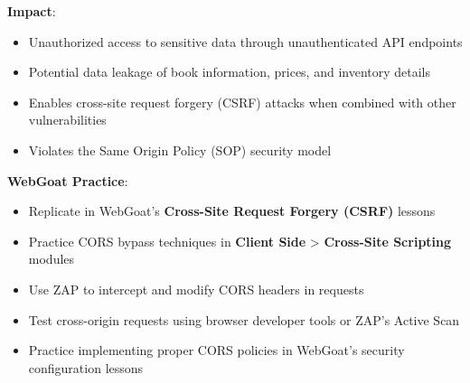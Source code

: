 \documentclass[]{UCD_CS_FYP_Report}
\begin{document}


\textbf{Impact}:
\begin{itemize}
    \item Unauthorized access to sensitive data through unauthenticated API endpoints
    \item Potential data leakage of book information, prices, and inventory details
    \item Enables cross-site request forgery (CSRF) attacks when combined with other vulnerabilities
    \item Violates the Same Origin Policy (SOP) security model
\end{itemize}

\textbf{WebGoat Practice}:
\begin{itemize}
    \item Replicate in WebGoat's \textbf{Cross-Site Request Forgery (CSRF)} lessons
    \item Practice CORS bypass techniques in \textbf{Client Side} > \textbf{Cross-Site Scripting} modules
    \item Use ZAP to intercept and modify CORS headers in requests
    \item Test cross-origin requests using browser developer tools or ZAP's Active Scan
    \item Practice implementing proper CORS policies in WebGoat's security configuration lessons
\end{itemize}
\end{document}
